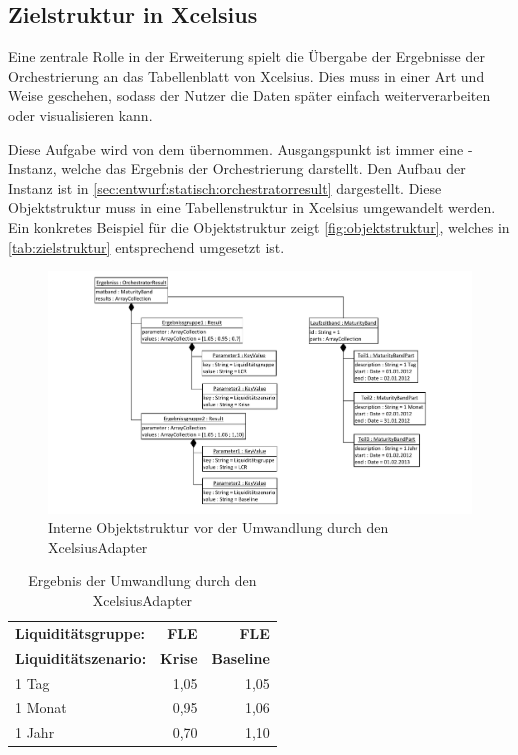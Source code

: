 \begin{onehalfspacing}
\subsection{Zielstruktur in \gls{Xcelsius}}
Eine zentrale Rolle in der Erweiterung spielt die Übergabe der Ergebnisse der Orchestrierung an das Tabellenblatt von \gls{Xcelsius}. Dies muss in einer Art und Weise geschehen, sodass der Nutzer die Daten später einfach weiterverarbeiten oder visualisieren kann.

Diese Aufgabe wird von dem  übernommen. Ausgangspunkt ist immer eine -Instanz, welche das Ergebnis der Orchestrierung darstellt. Den Aufbau der Instanz ist in \vref{sec:entwurf:statisch:orchestratorresult} dargestellt. Diese Objektstruktur muss in eine Tabellenstruktur in \gls{Xcelsius} umgewandelt werden. Ein konkretes Beispiel für die Objektstruktur zeigt \vref{fig:objektstruktur}, welches in \vref{tab:zielstruktur} entsprechend umgesetzt ist.

\begin{figure}[!ht]
\centering
\setlength{\unitlength}{1mm}
\includegraphics[width=15cm]{Visio/Entwurf-Objektstruktur.pdf}
\caption{Interne Objektstruktur vor der Umwandlung durch den XcelsiusAdapter \label{fig:objektstruktur}}
\end{figure} 

\begin{table}[h]
  \centering
  \caption{Ergebnis der Umwandlung durch den XcelsiusAdapter}
    \begin{tabular}{l|r|r}
    \toprule
    \textbf{Liquiditätsgruppe:} & \textbf{FLE} & \textbf{FLE} \\
    \textbf{Liquiditätszenario:} & \textbf{Krise} & \textbf{Baseline} \\
    \midrule
    1 Tag & 1,05  & 1,05 \\
    1 Monat & 0,95  & 1,06 \\
    1 Jahr & 0,70  & 1,10 \\
    \bottomrule
    \end{tabular}%
  \label{tab:zielstruktur}%
\end{table}%


\end{onehalfspacing}
